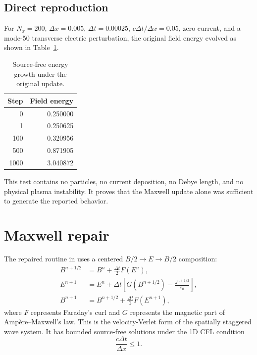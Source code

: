 \documentclass[11pt,a4paper]{article}
\newcommand{\epsz}{\varepsilon_0}
\begin{document}
\subsection{Direct reproduction}

For $N_x=200$, $\Delta x=0.005$, $\Delta t=0.00025$,
$c\Delta t/\Delta x=0.05$, zero current, and a mode-50 transverse electric
perturbation, the original field energy evolved as shown in
Table~\ref{tab:old-energy}.

\begin{table}[h]
\centering
\caption{Source-free energy growth under the original update.}
\label{tab:old-energy}
\begin{tabular}{rr}
\toprule
Step & Field energy \\
\midrule
0 & 0.250000 \\
1 & 0.250625 \\
100 & 0.320956 \\
500 & 0.871905 \\
1000 & 3.040872 \\
\bottomrule
\end{tabular}
\end{table}

This test contains no particles, no current deposition, no Debye length, and
no physical plasma instability.  It proves that the Maxwell update alone was
sufficient to generate the reported behavior.

\section{Maxwell repair}

The repaired routine in  uses a centered
$B/2\rightarrow E\rightarrow B/2$ composition:
\begin{align}
  B^{n+1/2} &= B^n + \frac{\Delta t}{2}F(E^n),\\
  E^{n+1} &= E^n + \Delta t\left[G(B^{n+1/2})
               -\frac{J^{n+1/2}}{\epsz}\right],\\
  B^{n+1} &= B^{n+1/2}+\frac{\Delta t}{2}F(E^{n+1}),
\end{align}
where $F$ represents Faraday's curl and $G$ represents the magnetic part of
Amp\`ere--Maxwell's law.  This is the velocity-Verlet form of the spatially
staggered wave system.  It has bounded source-free solutions under the 1D CFL
condition
\begin{equation}
  \frac{c\Delta t}{\Delta x}\leq 1.
\end{equation}
\end{document}
